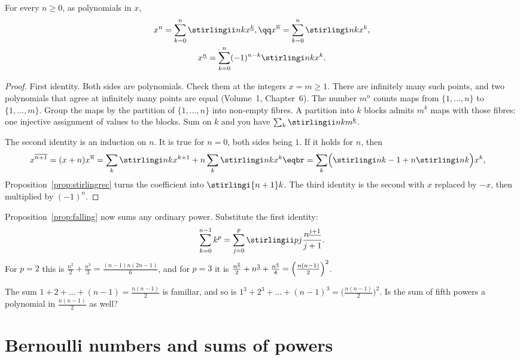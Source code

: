\begin{theorem}\label{thm:stirling}
For every $n\ge0$, as polynomials in $x$,
\[
\begin{gathered}x^n=\sum_{k=0}^n\stirlingii nk x^{\underline k},\qq x^{\overline n}=\sum_{k=0}^n\stirlingi nk x^k,\\ x^{\underline n}=\sum_{k=0}^n(-1)^{n-k}\stirlingi nk x^k.\end{gathered}
\]
\end{theorem}
\begin{proof}
First identity. Both sides are polynomials. Check them at the integers $x=m\ge1$. There are infinitely many such points, and two polynomials that agree at infinitely many points are equal (Volume~1, Chapter~6). The number $m^n$ counts maps from $\{1,\dots,n\}$ to $\{1,\dots,m\}$. Group the maps by the partition of $\{1,\dots,n\}$ into non-empty fibres. A partition into $k$ blocks admits $m^{\underline k}$ maps with those fibres: one injective assignment of values to the blocks. Sum on $k$ and you have $\sum_k\stirlingii nk m^{\underline k}$.

The second identity is an induction on $n$. It is true for $n=0$, both sides being $1$. If it holds for $n$, then
\[
\begin{aligned}x^{\overline{n+1}}&=(x+n)x^{\overline n}=\sum_k\stirlingi nk x^{k+1}+n\sum_k\stirlingi nk x^k\eqbr=\sum_k\Bigl(\stirlingi n{k-1}+n\stirlingi nk\Bigr)x^k,\end{aligned}
\]
Proposition~\ref{prop:stirlingrec} turns the coefficient into $\stirlingi{n+1}k$. The third identity is the second with $x$ replaced by $-x$, then multiplied by $(-1)^n$.
\end{proof}

Proposition~\ref{prop:falling} now sums any ordinary power. Substitute the first identity:
\[
\sum_{k=0}^{n-1}k^p=\sum_{j=0}^p\stirlingii pj\frac{n^{\underline{j+1}}}{j+1}.
\]
For $p=2$ this is $\frac{n^{\underline2}}2+\frac{n^{\underline3}}3=\frac{(n-1)n(2n-1)}6$, and for $p=3$ it is
$\frac{n^{\underline2}}2+n^{\underline3}+\frac{n^{\underline4}}4=\Bigl(\frac{n(n-1)}2\Bigr)^2$.

\begin{think}
The sum $1+2+\dots+(n-1)=\frac{n(n-1)}2$ is familiar, and so is $1^3+2^3+\dots+(n-1)^3=\bigl(\frac{n(n-1)}2\bigr)^2$. Is the sum of fifth powers a polynomial in $\frac{n(n-1)}2$ as well?
\end{think}

\section{Bernoulli numbers and sums of powers}

